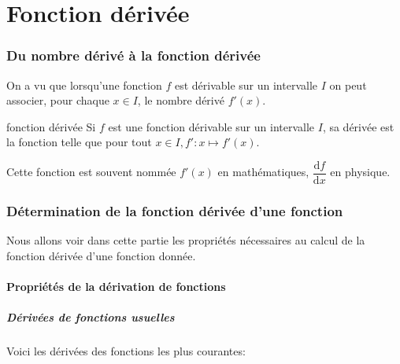 \documentclass[a4paper,12pt]{scrartcl}
\begin{document}
\part{Fonction dérivée}

\section{Du nombre dérivé à la fonction dérivée}

On a vu que lorsqu'une fonction $f$ est dérivable sur un intervalle $I$ on peut associer, pour chaque $x \in I$, le nombre dérivé $f'(x)$. 

\begin{definition}{fonction dérivée}
Si $f$ est une fonction dérivable sur un intervalle $I$, sa dérivée est la fonction telle que pour tout $x \in I, f': x \longmapsto f'(x)$. 
\end{definition}

Cette fonction est souvent nommée $f'(x)$ en mathématiques, $\dfrac{\mathrm{d} f}{\mathrm{d} x}$ en physique.

\section{Détermination de la fonction dérivée d'une fonction}

Nous allons voir dans cette partie les propriétés nécessaires au calcul de la fonction dérivée d'une fonction donnée.

\subsection{Propriétés de la dérivation de fonctions}

\subsubsection{Dérivées de fonctions usuelles}

Voici les dérivées des fonctions les plus courantes:
\end{document}
